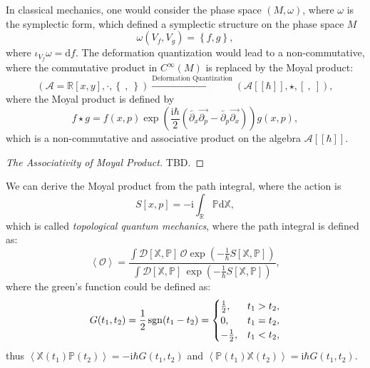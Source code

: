 \documentclass[10pt]{article}
\begin{document}
In classical mechanics, one would consider the phase space $(M, \omega)$, where $ \omega$ is the symplectic form, which defined a symplectic structure on the phase space $ M$
\begin{equation*}
  \omega(V_{f}, V_{g}) = \left\{ f, g \right\},
\end{equation*}
where $ \iota_{V_f} \omega = \mathrm{d} f$. The deformation quantization would lead to a non-commutative, where the commutative product in $ C^{\infty }(M)$ is replaced by the Moyal product:
\begin{equation*}
  \left( \mathcal{A} = \mathbb{R}[x,y], \cdot, \left\{ ~, ~ \right\} \right) \xrightarrow{\text{Deformation Quantization}} \left( \mathcal{A}[[\hbar]], \star, [~,~] \right),
\end{equation*}
where the Moyal product is defined by
\begin{equation*}
  f \star g = f(x,p) \exp\left( \frac{\mathrm{i}\hbar}{2} \left( \overleftarrow{\partial_x} \overrightarrow{\partial_p} - \overleftarrow{\partial_p} \overrightarrow{\partial_x} \right) \right) g(x,p),
\end{equation*}
which is a non-commutative and associative product on the algebra $ \mathcal{A}[[\hbar]]$.
\begin{proof}[The Associativity of Moyal Product]
  TBD.
\end{proof}

We can derive the Moyal product from the path integral, where the action is
\begin{equation*}
  S[x,p] = - \mathrm{i} \int _{\mathbb{R}} \mathbb{P} \mathrm{d} \mathbb{X},
\end{equation*}
which is called \emph{topological quantum mechanics}, where the path integral is defined as:
\begin{equation*}
  \left< \mathcal{O} \right> = \frac{\int \mathcal{D}[\mathbb{X}, \mathbb{P}] \, \mathcal{O} \exp\left( -\frac{1}{\hbar} S[\mathbb{X} , \mathbb{P}] \right)}{\int \mathcal{D}[\mathbb{X}, \mathbb{P}] \, \exp\left( -\frac{1}{\hbar} S[\mathbb{X}, \mathbb{P}] \right)},
\end{equation*}
where the green's function could be defined as:
\begin{equation*}
  G(t_1,t_2) = \frac{1}{2} \operatorname{sgn}(t_1 - t_2) =
  \begin{cases}
    \frac{1}{2}, & t_1 > t_2, \\
    0, & t_1 = t_2, \\
    -\frac{1}{2}, & t_1 < t_2,
  \end{cases}
\end{equation*}
thus $\left< \mathbb{X}(t_1) \mathbb{P}(t_2)\right> = - \mathrm{i}\hbar G(t_1, t_2)$ and $\left< \mathbb{P}(t_1) \mathbb{X}(t_2)\right> = \mathrm{i} \hbar G(t_1 , t_2)$.
\end{document}
